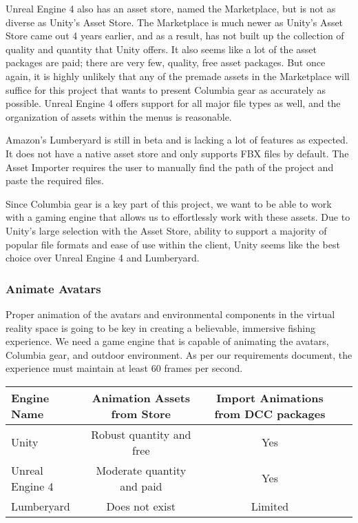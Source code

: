 \documentclass[10pt,journal,compsoc,onecolumn, draftclsnofoot]{IEEEtran}
\begin{document}
Unreal Engine 4 also has an asset store, named the Marketplace, but is not as diverse as Unity's Asset Store. The Marketplace is much newer\cite{unreal_marketplace_date} as Unity's Asset Store came out 4 years earlier, and as a result, has not built up the collection of quality and quantity that Unity offers. It also seems like a lot of the asset packages are paid; there are very few, quality, free asset packages. But once again, it is highly unlikely that any of the premade assets in the Marketplace will suffice for this project that wants to present Columbia gear as accurately as possible. Unreal Engine 4 offers support for all major file types as well, and the organization of assets within the menus is reasonable.

Amazon's Lumberyard is still in beta and is lacking a lot of features as expected. It does not have a native asset store and only supports FBX files by default. The Asset Importer requires the user to manually find the path of the project and paste the required files\cite{lumberyard_import}.

Since Columbia gear is a key part of this project, we want to be able to work with a gaming engine that allows us to effortlessly work with these assets. Due to Unity's large selection with the Asset Store, ability to support a majority of popular file formats and ease of use within the client, Unity seems like the best choice over Unreal Engine 4 and Lumberyard.

\subsubsection{Animate Avatars}
Proper animation of the avatars and environmental components in the virtual reality space is going to be key in creating a believable, immersive fishing experience. We need a game engine that is capable of animating the avatars, Columbia gear, and outdoor environment. As per our requirements document, the experience must maintain at least 60 frames per second.

\vspace{2mm}
\begin{table}[h!]
\centering
  \begin{tabular}{ | l || c | c | c | }
  \hline
  Engine Name & Animation Assets from Store & Import Animations from DCC packages\\
  \hline
  Unity & Robust quantity and free &  Yes\\ \hline
  Unreal Engine 4 & Moderate quantity and paid & Yes\\ \hline
  Lumberyard & Does not exist & Limited\\ \hline
  \end{tabular}
\end{table}
\vspace{2mm}
\end{document}

